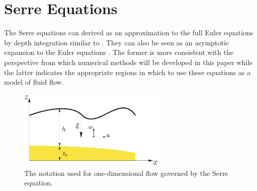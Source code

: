 \documentclass[SingleSpace,12pt]{Serre_ASCE}
\begin{document}
\section{Serre Equations}
\label{section:Serre Equations}
The Serre equations can derived as an approximation to the full Euler equations by depth integration similar to . They can also be seen as an asymptotic expansion to the Euler equations \cite{Bonneton-Lannes-2009-16601}. The former is more consistent with the perspective from which numerical methods will be developed in this paper while the latter indicates the appropriate regions in which to use these equations as a model of fluid flow.
\begin{figure}[htb]
\begin{center}
\includegraphics[width=7.0cm]{one-dimensional-axis_Serre.eps}
\end{center}
\caption{The notation used for one-dimensional flow governed by the Serre equation.}
\label{fig:Notation}
\end{figure}
\end{document}
